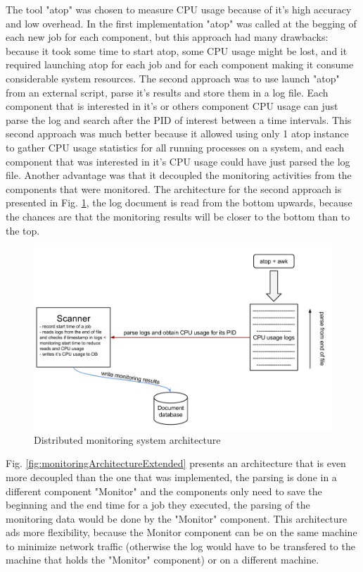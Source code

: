 The tool "atop" was chosen to measure CPU usage because of it's high accuracy and low overhead. In the first implementation "atop" was called at the begging of each new job for each component, but this approach had many drawbacks: because it took some time to start atop, some CPU usage might be lost, and it required launching atop for each job and for each component making it consume considerable system resources. The second approach was to use launch "atop" from an external script, parse it's results and store them in a log file. Each component that is interested in it's or others component CPU usage can just parse the log and search after the PID of interest between a time intervals. This second approach was much better because it allowed using only 1 atop instance to gather CPU usage statistics for all running processes on a system, and each component that was interested in it's CPU usage could have just parsed the log file. Another advantage was that it decoupled the monitoring activities from the components that were monitored. The architecture for the second approach is presented in Fig. \ref{fig:monitoringArchitecture}, the log document is read from the bottom upwards, because the chances are that the monitoring results will be closer to the bottom than to the top.

\begin{figure}[t]
\centering
\includegraphics[width=\linewidth]{./img/MonitoringCPUMechanism.png}
\caption{Distributed monitoring system architecture}
\label{fig:monitoringArchitecture}
\end{figure}

Fig. \ref{fig:monitoringArchitectureExtended}  presents an architecture that is even more decoupled than the one that was implemented, the parsing is done in a different component "Monitor" and the components only need to save the beginning and the end time for a job they executed, the parsing of the monitoring data would be done by the "Monitor" component. This architecture ads more flexibility, because the Monitor component can be on the same machine to minimize network traffic (otherwise the log would have to be transfered to the machine that holds the "Monitor" component) or on a different machine.



